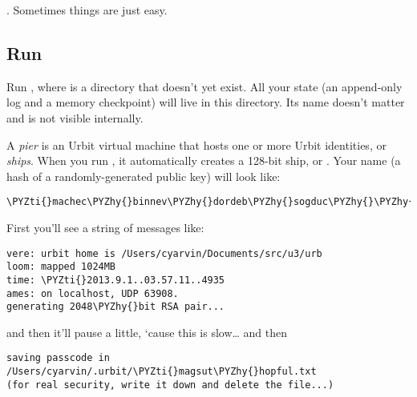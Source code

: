 .  Sometimes things are just easy.

\subsection{Run}

Run , where  is a directory that doesn't yet exist.
All your state (an append-only log and a memory checkpoint) will live in this
directory.  Its name doesn't matter and is not visible internally.

A \emph{pier} is an Urbit virtual machine that hosts one or more Urbit identities,
or \emph{ships}.  When you run , it automatically creates a 128-bit ship,
or .  Your name (a hash of a randomly-generated public key) will
look like:

\begin{framed_shaded}
\begin{Verbatim}[fontsize=\relsize{-2.5},fontseries=b,commandchars=\\\{\}]
\PYZti{}machec\PYZhy{}binnev\PYZhy{}dordeb\PYZhy{}sogduc\PYZhy{}\PYZhy{}dosmul\PYZhy{}sarrum\PYZhy{}faplec\PYZhy{}nidted
\end{Verbatim}
\end{framed_shaded}

First you'll see a string of messages like:

\begin{framed_shaded}
\begin{Verbatim}[fontsize=\relsize{-2.5},fontseries=b,commandchars=\\\{\}]
vere: urbit home is /Users/cyarvin/Documents/src/u3/urb
loom: mapped 1024MB
time: \PYZti{}2013.9.1..03.57.11..4935
ames: on localhost, UDP 63908.
generating 2048\PYZhy{}bit RSA pair...
\end{Verbatim}
\end{framed_shaded}

and then it'll pause a little, `cause this is slow\ldots{} and then

\begin{framed_shaded}
\begin{Verbatim}[fontsize=\relsize{-2.5},fontseries=b,commandchars=\\\{\}]
saving passcode in /Users/cyarvin/.urbit/\PYZti{}magsut\PYZhy{}hopful.txt
(for real security, write it down and delete the file...)
\end{Verbatim}
\end{framed_shaded}

